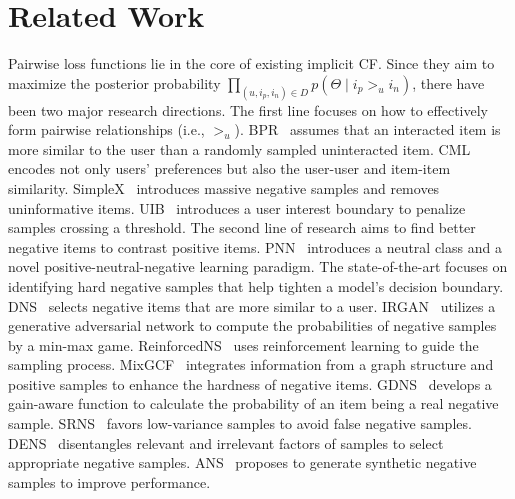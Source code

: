 \section{Related Work}
Pairwise loss functions lie in the core of existing implicit CF. Since they aim to maximize the posterior probability $\prod_ {(u, i_p, i_n) \in D}p(\Theta \mid i_p>_{u}i_n)$, there have been two major research directions. The first line focuses on how to effectively form pairwise relationships (i.e., $>_{u}$). BPR~\cite{RFG12, SGZ20,YYG21} assumes that an interacted item is more similar to the user than a randomly sampled uninteracted item. CML~\cite{HYC17} encodes not only users' preferences but also the user-user and item-item similarity. SimpleX~\cite{MZW21} introduces massive negative samples and removes uninformative items. UIB~\cite{ZZY22} introduces a user interest boundary to penalize samples crossing a threshold. The second line of research aims to find better negative items to contrast positive items. PNN~\cite{ZCH24} introduces a neutral class and a novel positive-neutral-negative learning paradigm. The state-of-the-art focuses on identifying hard negative samples that help tighten a model's decision boundary. DNS~\cite{ZCW13} selects negative items that are more similar to a user. IRGAN~\cite{WYZ17} utilizes a generative adversarial network to compute the probabilities of negative samples by a min-max game. ReinforcedNS~\cite{DQH19} uses reinforcement learning to guide the sampling process. MixGCF~\cite{HDD21} integrates information from a graph structure and positive samples to enhance the hardness of negative items. GDNS~\cite{ZZH22} develops a gain-aware function to calculate the probability of an item being a real negative sample. SRNS~\cite{DQY20} favors low-variance samples to avoid false negative samples. DENS~\cite{LCZ23} disentangles relevant and irrelevant factors of samples to select appropriate negative samples. ANS~\cite{ZCL23} proposes to generate synthetic negative samples to improve performance. 
